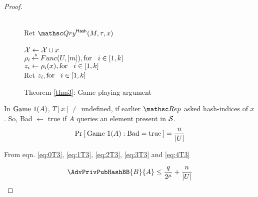 \begin{proof}
\begin{figure}
{{\medskip
{}\\
Ret $\Qry^{\HashOracle}(M,\tau,x)$\\

\medskip
{}\\
${\cal X} \gets {\cal X} \cup x$\\ 
$\rho_i {\:\stackrel{{\scriptscriptstyle \hspace{0.2em}\$}} {\leftarrow}\:} Func(U,[m]), \mathrm{for} \hspace*{2ex} i \in [1,k]$\\
$z_i \gets \rho_i(x), \mathrm{for} \hspace*{2ex} i \in [1,k]$\\
Ret $z_i, \mathrm{for} \hspace*{2ex} i \in [1,k]$
}
}
\caption{Theorem \ref{thm3}: Game playing argument}\label{fig:Game2T3}
\end{figure}

In $\text{Game 1}(A)$, $T[x]\neq$ undefined, if earlier $\Rep$ asked hash-indices of $x$. So,  Bad $\gets$ true if $A$ queries an element present in ${\cal S}$. 
\begin{equation}
\Pr\left[\: \text{Game 1}(A):\mathrm{Bad} = \mathrm{true} \:\right] = \frac{n}{{\displaystyle \left| {U} \right| }}\label{eq:4T3}
\end{equation}

From eqn. \ref{eq:0T3}, \ref{eq:1T3}, \ref{eq:2T3}, \ref{eq:3T3} and \ref{eq:4T3}

\begin{equation}
\AdvPrivPubHashBB{B}{A} \leq  \frac{q}{2^\mu} + \frac{n}{\abs{U}}
\end{equation}

\end{proof}
